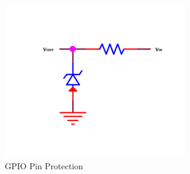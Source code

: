 \begin{figure}
\begin{center}
\includegraphics[width=8cm]{implementation/figures/GPIOprotection}
\end{center}
\caption{GPIO Pin Protection}
\label{fig:GPIOprotection}
\end{figure}

